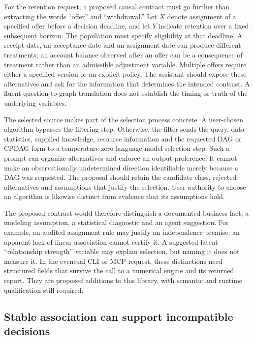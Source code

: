 For the retention request, a proposed causal contract must go further than
extracting the words ``offer'' and ``withdrawal.'' Let $X$ denote assignment of
a specified offer before a decision deadline, and let $Y$ indicate retention
over a fixed subsequent horizon. The population must specify eligibility at
that deadline. A receipt date, an acceptance date and an assignment date can
produce different treatments; an account balance observed after an offer can
be a consequence of treatment rather than an admissible adjustment variable.
Multiple offers require either a specified version or an explicit policy.
The assistant should expose these alternatives and ask for the information
that determines the intended contrast. A fluent question-to-graph translation
does not establish the timing or truth of the underlying variables.

The selected source makes part of the selection process concrete. A user-chosen
algorithm bypasses the filtering step. Otherwise, the filter sends the query,
data statistics, supplied knowledge, resource information and the requested
DAG or CPDAG form to a temperature-zero language-model selection step. Such a
prompt can organize alternatives and enforce an output preference. It cannot
make an observationally undetermined direction identifiable merely because a
DAG was requested. The proposal should retain the candidate class, rejected
alternatives and assumptions that justify the selection. User authority to
choose an algorithm is likewise distinct from evidence that its assumptions
hold.~\citep{exec17_copilot_code}

The proposed contract would therefore distinguish a documented business fact,
a modeling assumption, a statistical diagnostic and an agent suggestion.
For example, an audited assignment rule may justify an independence premise;
an apparent lack of linear association cannot certify it. A suggested latent
``relationship strength'' variable may explain selection, but naming it does
not measure it. In the eventual CLI or MCP request, these distinctions need
structured fields that survive the call to a numerical engine and its returned
report. They are proposed additions to this library, with semantic and runtime
qualification still required.

\subsection{Stable association can support incompatible decisions}

